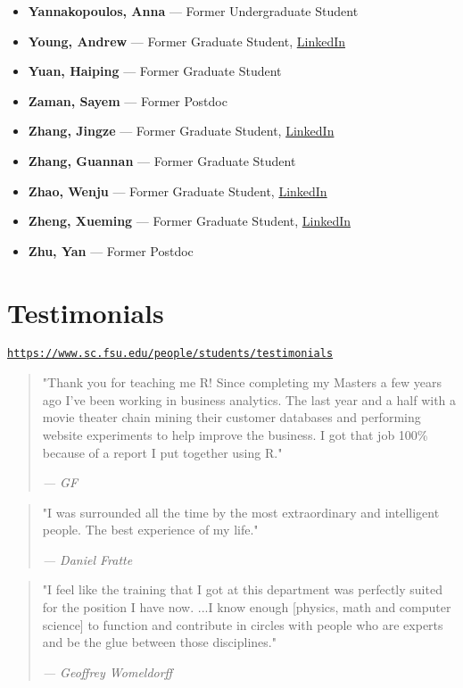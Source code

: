 \documentclass[12pt,a4paper]{article}
\begin{document}
\begin{itemize}
    \item \textbf{Yannakopoulos, Anna} --- Former Undergraduate Student
    \item \textbf{Young, Andrew} --- Former Graduate Student, \href{https://www.linkedin.com/in/andrew-young-9029a544/}{LinkedIn}
    \item \textbf{Yuan, Haiping} --- Former Graduate Student
    \item \textbf{Zaman, Sayem} --- Former Postdoc
    \item \textbf{Zhang, Jingze} --- Former Graduate Student, \href{https://www.linkedin.com/in/jingze-zhang-669299150/}{LinkedIn}
    \item \textbf{Zhang, Guannan} --- Former Graduate Student
    \item \textbf{Zhao, Wenju} --- Former Graduate Student, \href{https://www.linkedin.com/in/wenju-zhao-80126a117/}{LinkedIn}
    \item \textbf{Zheng, Xueming} --- Former Graduate Student, \href{https://www.linkedin.com/in/xueming-zheng-76506412b/}{LinkedIn}
    \item \textbf{Zhu, Yan} --- Former Postdoc
\end{itemize}

\section{Testimonials}
\texttt{\url{https://www.sc.fsu.edu/people/students/testimonials}}

\begin{quote}
"Thank you for teaching me R! Since completing my Masters a few years ago I’ve been working in business analytics. The last year and a half with a movie theater chain mining their customer databases and performing website experiments to help improve the business. I got that job 100\% because of a report I put together using R."
\par\raggedleft\textit{--- GF}
\end{quote}

\begin{quote}
"I was surrounded all the time by the most extraordinary and intelligent people. The best experience of my life."
\par\raggedleft\textit{--- Daniel Fratte}
\end{quote}

\begin{quote}
"I feel like the training that I got at this department was perfectly suited for the position I have now. ...I know enough [physics, math and computer science] to function and contribute in circles with people who are experts and be the glue between those disciplines."
\par\raggedleft\textit{--- Geoffrey Womeldorff}
\end{quote}
\end{document}

